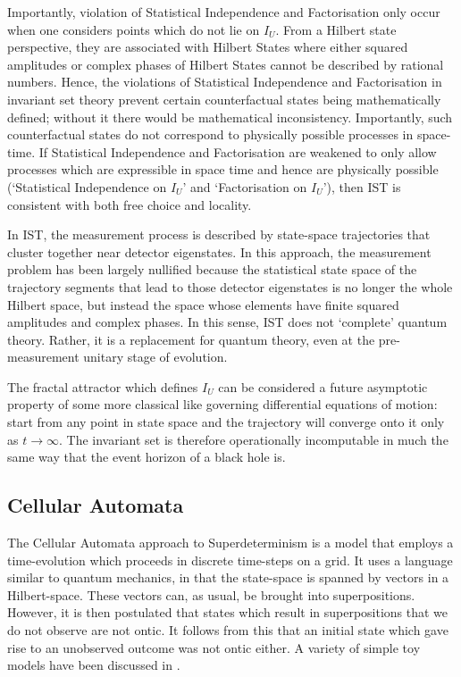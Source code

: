 \documentclass[12pt]{article}
\begin{document}
Importantly, violation of Statistical Independence and Factorisation only occur when one considers points which do not lie on  $I_U$. From a Hilbert state perspective, they are associated with Hilbert States where either squared amplitudes or complex phases of Hilbert States cannot be described by rational numbers. Hence, the violations of Statistical Independence and Factorisation in invariant set theory prevent certain counterfactual states being mathematically defined; without it there would be mathematical inconsistency. Importantly, such counterfactual states do not correspond to physically possible processes in space-time. If Statistical Independence and Factorisation are weakened to only allow processes which are expressible in space time and hence are physically possible (`Statistical Independence on $I_U$' and `Factorisation on $I_U$'), then IST is consistent with both free choice and locality. 

In IST, the measurement process is described by state-space trajectories that cluster together near detector eigenstates. In this approach, the measurement problem has been largely nullified because the statistical state space of the trajectory segments that lead to those detector eigenstates is no longer the whole Hilbert space, but instead the space whose elements have finite squared amplitudes and complex phases. In this sense, IST does not `complete' quantum theory. Rather, it is a replacement for quantum theory, even at the pre-measurement unitary stage of evolution.

The fractal attractor which defines $I_U$ can be considered a future asymptotic property of some more classical like governing differential equations of motion: start from any point in state space and the trajectory will converge onto it only as $t \rightarrow \infty$. The invariant set is therefore operationally incomputable in much the same way that the event horizon of a black hole is. 

\subsection{Cellular Automata}
\label{thooft}

The Cellular Automata approach to Superdeterminism \cite{Hooft:2014kka} is a model that employs a time-evolution which proceeds in discrete time-steps on a grid. It uses a language similar to quantum mechanics, in that the state-space is spanned by vectors in a Hilbert-space. These vectors can, as usual, be brought into superpositions. However, it is then postulated that states which result in superpositions that we do not observe are not ontic. It follows from this that an initial state which gave rise to an unobserved outcome was not ontic either.
A variety of simple toy models have been discussed in \cite{Hooft:2014kka}. 
\end{document}
